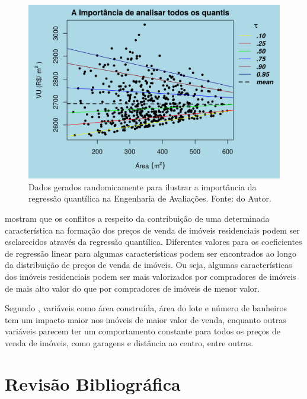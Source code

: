 \documentclass[a4paper, 12pt]{article}
\begin{document}
\begin{figure}[H]

{\centering \includegraphics[width=1\linewidth]{images/urb-1} 

}

\caption{Dados gerados randomicamente para ilustrar a importância da regressão quantílica na Engenharia de Avaliações. Fonte: do Autor.}\label{fig:urb}
\end{figure}

\textcite{Zietz} mostram que os conflitos a respeito da contribuição de
uma determinada característica na formação dos preços de venda de
imóveis residenciais podem ser esclarecidos através da regressão
quantílica. Diferentes valores para os coeficientes de regressão linear
para algumas características podem ser encontrados ao longo da
distribuição de preços de venda de imóveis. Ou seja, algumas
características dos imóveis residenciais podem ser mais valorizados por
compradores de imóveis de mais alto valor do que por compradores de
imóveis de menor valor.

Segundo \textcite{Zietz}, variáveis como área construída, área do lote e
número de banheiros tem um impacto maior nos imóveis de maior valor de
venda, enquanto outras variáveis parecem ter um comportamento constante
para todos os preços de venda de imóveis, como garagens e distância ao
centro, entre outras.

\hypertarget{revisao-bibliografica}{%
\section{Revisão Bibliográfica}\label{revisao-bibliografica}}
\end{document}
